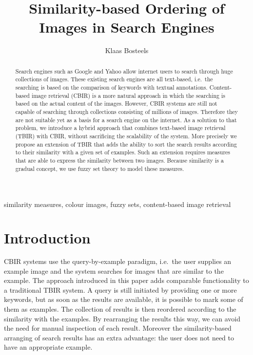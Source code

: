 \documentclass[twocolumn]{phdsymp} %
\begin{document}
\title{Similarity-based Ordering of\\Images in Search Engines} %

\author{Klaas Bosteels}


\maketitle

\begin{abstract}
Search engines such as Google and Yahoo allow internet users to search through huge collections of 
images. These existing search engines are all text-based, i.e.~the searching is based on 
the comparison of keywords with textual annotations. Content-based image retrieval (CBIR) 
is a more natural approach in which the searching is based on the actual content of the images. 
However, CBIR systems are still not capable of searching through collections
consisting of millions of images. Therefore they are not suitable yet as a basis for a search engine
on the internet. As a solution to that problem, we introduce a hybrid approach that combines
text-based image retrieval (TBIR) with CBIR, without sacrificing the 
scalability of the system. More precisely we propose an extension of TBIR that adds the 
a\-bi\-li\-ty to sort the search results according to their similarity with a given set of 
examples. Such an extension requires measures that are able to express the similarity
between two images. Because similarity is a gradual concept, we use fuzzy set theory to 
model these measures. 
\end{abstract}

\begin{keywords}
similarity measures, colour images, fuzzy sets, content-based image retrieval
\end{keywords}

\section{Introduction}
 CBIR systems use the query-by-example paradigm, i.e.~the user
supplies an example image and the system searches for images that are similar to the example.
The approach introduced in this paper adds comparable functionality to a traditional 
TBIR system. A query is still initiated by providing one or more keywords, but as soon as
the results are available, it is possible to mark some of them as examples. The
collection of results is then reordered according to the similarity with the examples.
By rearranging the results this way, we can avoid the need for manual inspection of each result. Moreover the
similarity-based arranging of search results has an extra advantage: the user does not need
to have an appropriate example.
\end{document}
